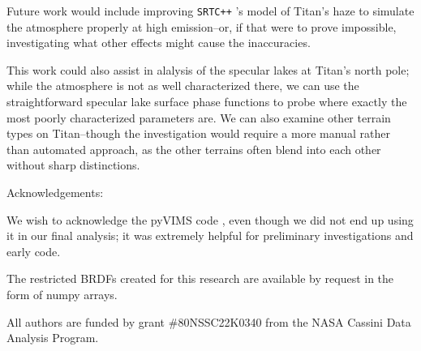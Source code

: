 \documentclass[twocolumn,linenumbers]{aastex631}
\def\srtcppspace{{\tt SRTC++} }
\begin{document}
Future work would include improving \srtcppspace's model of Titan's haze to simulate the atmosphere properly at high emission--or, if that were to prove impossible, investigating what other effects might cause the inaccuracies.

This work could also assist in alalysis of the specular lakes at Titan's north pole; while the atmosphere is not as well characterized there, we can use the straightforward specular lake surface phase functions to probe where exactly the most poorly characterized parameters are. We can also examine other terrain types on Titan--though the investigation would require a more manual rather than automated approach, as the other terrains often blend into each other without sharp distinctions.

\begin{acknowledgments}

Acknowledgements:

We wish to acknowledge the pyVIMS code \citep{Seignovert2021}, even though we did not end up using it in our final analysis; it was extremely helpful for preliminary investigations and early code.

The restricted BRDFs created for this research are available by request in the form of numpy arrays.

All authors are funded by grant \#80NSSC22K0340 from the NASA Cassini Data Analysis Program.

\end{acknowledgments}

\label{ACK}

{}


\end{document}
